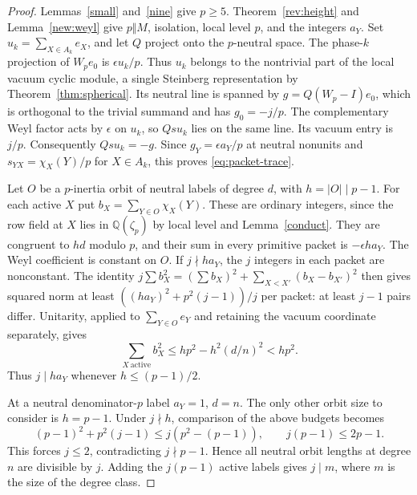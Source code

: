 \documentclass[11pt]{amsart}
\numberwithin{equation}{section}
\theoremstyle{definition}
\theoremstyle{plain}
\newcommand{\QQ}{\mathbb Q}
\begin{document}
\begin{proof}
Lemmas~\ref{small} and~\ref{nine} give $p\ge5$.
Theorem~\ref{rev:height} and Lemma~\ref{new:weyl} give $p\Vert M$,
isolation, local level $p$, and the integers $a_Y$.
Set $u_k=\sum_{X\in A_k}e_X$, and let $Q$ project onto the
$p$-neutral space. The phase-$k$ projection of $W_pe_0$ is
$\epsilon u_k/p$. Thus $u_k$ belongs to the nontrivial part of the
local vacuum cyclic module, a single Steinberg representation by
Theorem~\ref{thm:spherical}. Its neutral line is spanned by
$g=Q(W_p-I)e_0$, which is orthogonal to the trivial summand and
has $g_0=-j/p$. The complementary Weyl factor acts by $\epsilon$ on
$u_k$, so $Qsu_k$ lies on the same line. Its vacuum entry is $j/p$.
Consequently $Qsu_k=-g$. Since $g_Y=\epsilon a_Y/p$ at neutral
nonunits and $s_{YX}=\chi_X(Y)/p$ for $X\in A_k$, this proves
\eqref{eq:packet-trace}.

Let $O$ be a $p$-inertia orbit of neutral labels of degree $d$,
with $h=|O|\mid p-1$. For each active $X$ put
$b_X=\sum_{Y\in O}\chi_X(Y)$. These are ordinary integers, since
the row field at $X$ lies in $\QQ(\zeta_p)$ by local level and
Lemma~\ref{conduct}. They are congruent to $hd$ modulo $p$, and their
sum in every primitive packet is $-\epsilon h a_Y$. The Weyl
coefficient is constant on $O$. If $j\nmid h a_Y$, the $j$
integers in each packet are nonconstant. The identity
$j\sum b_X^2=(\sum b_X)^2+\sum_{X<X'}(b_X-b_{X'})^2$
then gives squared norm at least
$((h a_Y)^2+p^2(j-1))/j$ per packet: at least $j-1$ pairs differ.
Unitarity, applied to $\sum_{Y\in O}e_Y$ and retaining the
vacuum coordinate separately, gives
\[
       \sum_{X\ \mathrm{active}} b_X^2
             \le hp^2-h^2(d/n)^2<hp^2 .
\]
Thus $j\mid h a_Y$ whenever $h\le(p-1)/2$.

At a neutral denominator-$p$ label $a_Y=1$, $d=n$. The only
other orbit size to consider is $h=p-1$. Under $j\nmid h$, comparison
of the above budgets becomes
\[
 (p-1)^2+p^2(j-1)\le j(p^2-(p-1)),
 \qquad j(p-1)\le2p-1 .
\]
This forces $j\le2$, contradicting $j\nmid p-1$. Hence all neutral
orbit lengths at degree $n$ are divisible by $j$. Adding the
$j(p-1)$ active labels gives $j\mid m$, where $m$ is the size of
the degree class.


\end{proof}
\end{document}
